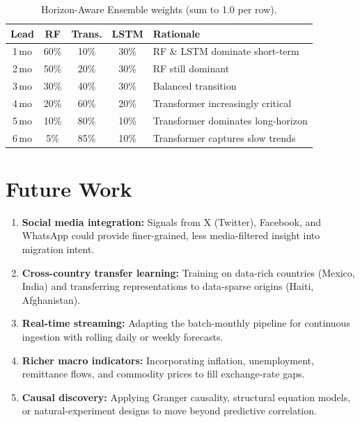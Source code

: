 \documentclass[11pt, a4paper]{article}
\begin{document}
\begin{appendices}
\begin{table}[ht]
  \centering
  \caption{Horizon-Aware Ensemble weights (sum to 1.0 per row).}
  \label{tab:ensemble_weights}
  \small
  \begin{tabular}{c c c c p{4.8cm}}
    \toprule
    \textbf{Lead} & \textbf{RF} & \textbf{Trans.} & \textbf{LSTM} &
    \textbf{Rationale} \\
    \midrule
    1\,mo & 60\% & 10\% & 30\% & RF \& LSTM dominate short-term \\
    2\,mo & 50\% & 20\% & 30\% & RF still dominant \\
    3\,mo & 30\% & 40\% & 30\% & Balanced transition \\
    4\,mo & 20\% & 60\% & 20\% & Transformer increasingly critical \\
    5\,mo & 10\% & 80\% & 10\% & Transformer dominates long-horizon \\
    6\,mo &  5\% & 85\% & 10\% & Transformer captures slow trends \\
    \bottomrule
  \end{tabular}
\end{table}


\section{Future Work}\label{app:futurework}

\begin{enumerate}
  \item \textbf{Social media integration:} Signals from X (Twitter), Facebook, and
        WhatsApp could provide finer-grained, less media-filtered insight into
        migration intent.
  \item \textbf{Cross-country transfer learning:} Training on data-rich countries
        (Mexico, India) and transferring representations to data-sparse origins (Haiti,
        Afghanistan).
  \item \textbf{Real-time streaming:} Adapting the batch-monthly pipeline for
        continuous ingestion with rolling daily or weekly forecasts.
  \item \textbf{Richer macro indicators:} Incorporating inflation, unemployment,
        remittance flows, and commodity prices to fill exchange-rate gaps.
  \item \textbf{Causal discovery:} Applying Granger causality, structural equation
        models, or natural-experiment designs to move beyond predictive correlation.
\end{enumerate}



\end{appendices}
\end{document}
